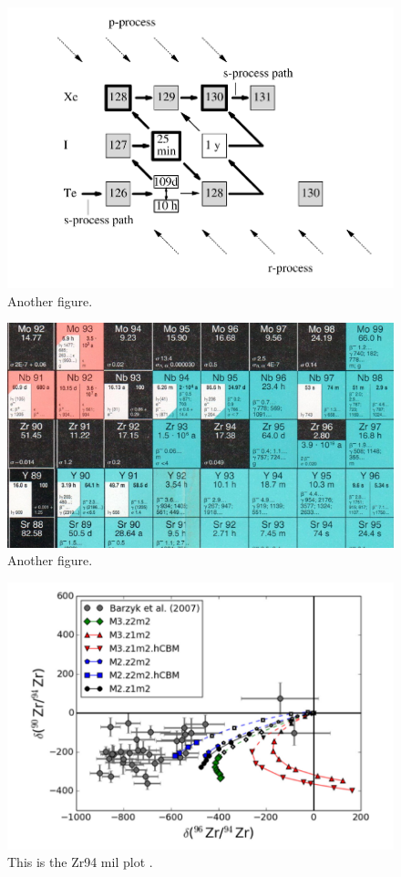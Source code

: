 \documentclass[fleqn,usenatbib]{mnras}
\begin{document}
\begin{figure}
	\includegraphics[width=\columnwidth]{figs/xe.png}
    \caption{Another figure.}
\end{figure}

\begin{figure}
	\includegraphics[width=\columnwidth]{figs/Zr95_branch.png}
    \caption{Another figure.}
\end{figure}

\begin{figure}
  \includegraphics[width=\columnwidth]{figs/Zr94.png}
  \caption{This is the Zr94 mil plot \citet{zr}.} 
\end{figure}
\end{document}

